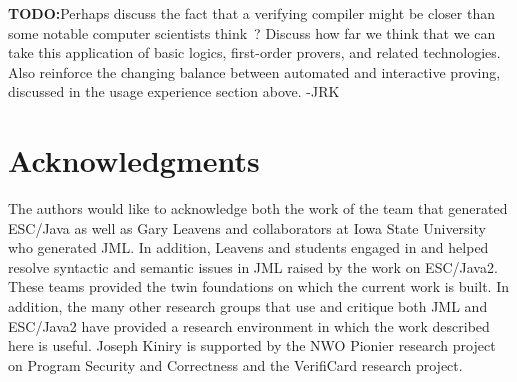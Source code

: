 \documentclass{acm_proc_article-sp}
\begin{document}
\large\textbf{TODO:}\normalsize Perhaps discuss the fact that a
verifying compiler might be closer than some notable computer
scientists think~\cite{Hoare03}?  Discuss how far we think that we can
take this application of basic logics, first-order provers, and
related technologies.  Also reinforce the changing balance between
automated and interactive proving, discussed in the usage experience
section above. -JRK

\section{Acknowledgments}
The authors would like to acknowledge both the work of the team that
generated ESC/Java as well as Gary Leavens and collaborators at Iowa
State University who generated JML.  In addition, Leavens and students
engaged in and helped resolve syntactic and semantic issues in JML
raised by the work on ESC/Java2.  These teams provided the twin
foundations on which the current work is built.  In addition, the many
other research groups that use and critique both JML and ESC/Java2
have provided a research environment in which the work described here
is useful.  Joseph Kiniry is supported by the NWO Pionier research
project on Program Security and Correctness and the VerifiCard
research project.

%

  
%
%
\balancecolumns

\end{document}
